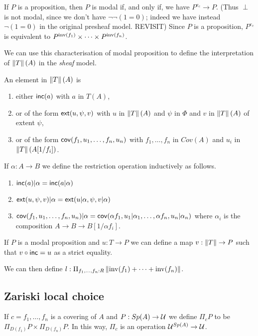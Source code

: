 \medskip

If $P$ is a proposition, then $P$ is modal if, and only if,
we have $P^{e_c}\rightarrow P$.
(Thus $\perp$ is not modal, since we don't have $\neg\neg(1=0)$; indeed we have instead $\neg(1=0)$ in
the original presheaf model.
{\color{red} REVISIT})
Since $P$ is a
proposition, $P^{e_c}$ is equivalent to $P^{\mathrm{inv}(f_1)}\times \dots\times P^{\mathrm{inv}(f_n)}$.

\medskip

We can use this characterisation of modal proposition to define the interpretation of
$\left\lVert T \right\rVert(A)$ in the {\em sheaf} model.

An element in $\left\lVert T \right\rVert(A)$ is
\begin{enumerate}
\item either $\mathsf{inc}(a)$ with $a$ in $T(A)$,
\item or of the form $\mathsf{ext}(u,\psi,v)$ with $u$ in $\left\lVert T \right\rVert(A)$ and $\psi$ in $\Phi$ and
  $v$ in $\left\lVert T \right\rVert(A)$ of extent $\psi$,
\item or of the form $\mathsf{cov}(f_1,u_1,\dots,f_n,u_n)$ with $f_1,\dots,f_n$ in $Cov(A)$ and $u_i$ in $\left\lVert T \right\rVert(A[1/f_i])$.
\end{enumerate}

If $\alpha:A\rightarrow B$ we define the restriction operation inductively as follows.
\begin{enumerate}
\item $\mathsf{inc}(a)|\alpha = \mathsf{inc}(a|\alpha)$
\item $\mathsf{ext}(u,\psi,v)|\alpha = \mathsf{ext}(u|\alpha,\psi,v|\alpha)$
\item $\mathsf{cov}(f_1,u_1,\dots,f_n,u_n)|\alpha = \mathsf{cov}(\alpha f_1,u_1|\alpha_1,\dots,\alpha f_n,u_n|\alpha_n)$ where
  $\alpha_i$ is the composition $A\rightarrow B\rightarrow B[1/\alpha f_i]$.
\end{enumerate}

If $P$ is a modal proposition and $u:T\rightarrow P$ we can define a map $v:\left\lVert T \right\rVert\rightarrow P$
such that $v\circ\mathsf{inc} = u$ as a strict equality.

We can then define $l:\Pi_{f_1,\dots,f_n:R}\left\lVert \mathrm{inv}(f_1)+\dots+\mathrm{inv}(f_n) \right\rVert$.

\subsection{Zariski local choice}

If $c = f_1,\dots,f_n$ is a covering of $A$ and $P:Sp(A)\rightarrow \mathcal{U}$ we define
$\Pi_c P$ to be $\Pi_{D(f_1)}P\times\Pi_{D(f_n)}P$. In this way, $\Pi_c$ is an operation
$\mathcal{U}^{Sp(A)}\rightarrow\mathcal{U}$.


